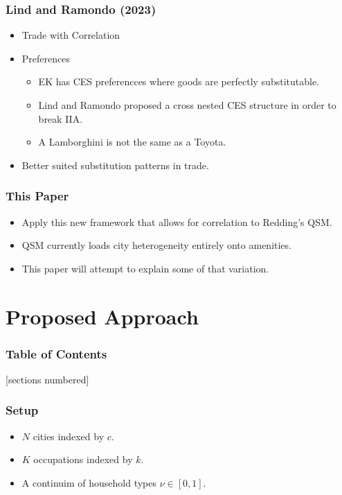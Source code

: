 \documentclass[serif, 9pt, aspectratio=32]{beamer}
\begin{document}
\begin{frame}
    \centering
    \frametitle{Lind and Ramondo (2023)}
    \begin{itemize}
        \setlength{\itemsep}{3em}
        \item Trade with Correlation
        \item Preferences
              \begin{itemize}
                  \setlength{\itemsep}{1em}
                  \item EK has CES preferencces where goods are perfectly substitutable.
                  \item Lind and Ramondo proposed a cross nested CES structure in order to break IIA.
                  \item A Lamborghini is not the same as a Toyota.
              \end{itemize}
        \item Better suited substitution patterns in trade.
    \end{itemize}
\end{frame}

\begin{frame}
    \centering
    \frametitle{This Paper}
    \begin{itemize}
        \setlength{\itemsep}{3em}
        \item Apply this new framework that allows for correlation to Redding's QSM.
        \item QSM currently loads city heterogeneity entirely onto amenities.
        \item This paper will attempt to explain some of that variation.
    \end{itemize}
\end{frame}

\section{Proposed Approach}

\begin{frame}
    \frametitle{Table of Contents}
    [sections numbered]
    \tableofcontents[currentsection]
\end{frame}

\begin{frame}
    \centering
    \frametitle{Setup}
    \begin{itemize}
        \setlength{\itemsep}{3em}
        \item $N$ cities indexed by $c$.
        \item $K$ occupations indexed by $k$.
        \item A continuim of household types $\nu \in [0,1]$.
    \end{itemize}
\end{frame}
\end{document}
